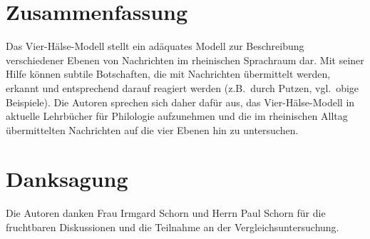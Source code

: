 \documentclass[11pt,DIV16,twocolumn]{scrartcl}
\begin{document}
\section{Zusammenfassung}

Das Vier-Hälse-Modell stellt ein adäquates Modell zur Beschreibung
verschiedener Ebenen von Nachrichten im rheinischen Sprachraum dar.
Mit seiner Hilfe können subtile Botschaften, die mit Nachrichten
übermittelt werden, erkannt und entsprechend darauf reagiert werden
(z.B.\ durch Putzen, vgl.\ obige Beispiele).  Die Autoren sprechen
sich daher dafür aus, das Vier-Hälse-Modell in aktuelle Lehrbücher für
Philologie aufzunehmen und die im rheinischen Alltag übermittelten
Nachrichten auf die vier Ebenen hin zu untersuchen.

\section*{Danksagung}

Die Autoren danken Frau Irmgard Schorn und Herrn Paul Schorn für die
fruchtbaren Diskussionen und die Teilnahme an der
Vergleichsuntersuchung.



\end{document}
